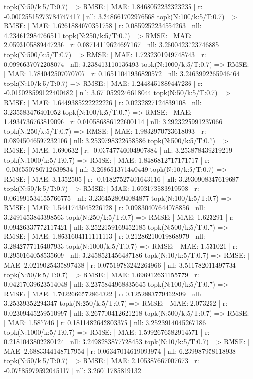 topk(N:50/k:5/T:0.7) => RMSE: | MAE: 1.8468052232323235 | r: -0.00025515273784747417 | nll: 3.248661702976568
topk(N:100/k:5/T:0.7) => RMSE: | MAE: 1.6261884070351758 | r: 0.0859252234554263 | nll: 4.234612984766511
topk(N:250/k:5/T:0.7) => RMSE: | MAE: 2.0593105889447236 | r: 0.08714119624697167 | nll: 3.2500423723746885
topk(N:500/k:5/T:0.7) => RMSE: | MAE: 1.7232301949748743 | r: 0.0996637072208074 | nll: 3.238413110136493
topk(N:1000/k:5/T:0.7) => RMSE: | MAE: 1.784042507070707 | r: 0.16511041936820572 | nll: 3.2463992265946464
topk(N:10/k:5/T:0.7) => RMSE: | MAE: 1.2448451889447236 | r: -0.019028599122400482 | nll: 3.6710529246618044
topk(N:50/k:5/T:0.7) => RMSE: | MAE: 1.6449385222222226 | r: 0.0232827124839108 | nll: 3.235583476401052
topk(N:100/k:5/T:0.7) => RMSE: | MAE: 1.4934736763819096 | r: 0.010586886122600114 | nll: 3.2923225991237066
topk(N:250/k:5/T:0.7) => RMSE: | MAE: 1.9832970723618093 | r: 0.08945046597232106 | nll: 3.2539798322658586
topk(N:500/k:5/T:0.7) => RMSE: | MAE: 1.690632 | r: -0.03747746004907884 | nll: 3.253878439219219
topk(N:1000/k:5/T:0.7) => RMSE: | MAE: 1.8486812717171717 | r: -0.036550780712639834 | nll: 3.269651371440449
topk(N:10/k:5/T:0.7) => RMSE: | MAE: 3.1352505 | r: -0.01827527401643116 | nll: 3.2930908347619687
topk(N:50/k:5/T:0.7) => RMSE: | MAE: 1.693173583919598 | r: 0.061991534155766775 | nll: 3.2364528094084877
topk(N:100/k:5/T:0.7) => RMSE: | MAE: 1.5441743045226128 | r: 0.09830407644078856 | nll: 3.2491453843398563
topk(N:250/k:5/T:0.7) => RMSE: | MAE: 1.623291 | r: 0.09426337772117421 | nll: 3.2522159169452185
topk(N:500/k:5/T:0.7) => RMSE: | MAE: 1.8631604111111113 | r: 0.21286210019868979 | nll: 3.2842777116407933
topk(N:1000/k:5/T:0.7) => RMSE: | MAE: 1.531021 | r: 0.2950164058535609 | nll: 3.2458521456487186
topk(N:10/k:5/T:0.7) => RMSE: | MAE: 2.0219025435897438 | r: 0.07519783242264966 | nll: 3.511782011497734
topk(N:50/k:5/T:0.7) => RMSE: | MAE: 1.696912631155779 | r: 0.04217039623514048 | nll: 3.2375844968835645
topk(N:100/k:5/T:0.7) => RMSE: | MAE: 1.7022666572864322 | r: 0.1252883779462899 | nll: 3.25339352294347
topk(N:250/k:5/T:0.7) => RMSE: | MAE: 2.073252 | r: 0.02309445259510997 | nll: 3.267700412621218
topk(N:500/k:5/T:0.7) => RMSE: | MAE: 1.587746 | r: 0.1811482642803375 | nll: 3.2523914045267186
topk(N:1000/k:5/T:0.7) => RMSE: | MAE: 1.5992676582914571 | r: 0.2181043802280124 | nll: 3.2498283877728453
topk(N:10/k:5/T:0.7) => RMSE: | MAE: 2.6883344148717954 | r: 0.06347014619093974 | nll: 6.239987958118938
topk(N:50/k:5/T:0.7) => RMSE: | MAE: 2.105387667007673 | r: -0.07585979592045117 | nll: 3.26011785819132
